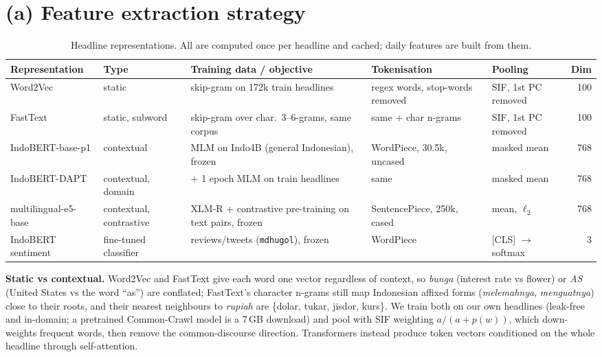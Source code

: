 \documentclass[10pt,a4paper]{article}
\begin{document}
\section{(a) Feature extraction strategy}
\begin{table}[h]
\centering\footnotesize
\caption{Headline representations. All are computed once per headline and cached; daily features are built from them.}
\label{tab:enc}
\begin{tabularx}{\textwidth}{@{}l l X p{3.3cm} p{2.3cm} r@{}}
\toprule
\textbf{Representation} & \textbf{Type} & \textbf{Training data / objective} & \textbf{Tokenisation} & \textbf{Pooling} & \textbf{Dim} \\
\midrule
Word2Vec & static & skip-gram on 172k train headlines & regex words, stop-words removed & SIF, 1st PC removed & 100 \\
FastText & static, subword & skip-gram over char.\ 3--6-grams, same corpus & same + char n-grams & SIF, 1st PC removed & 100 \\
IndoBERT-base-p1 & contextual & MLM on Indo4B (general Indonesian), frozen & WordPiece, 30.5k, uncased & masked mean & 768 \\
IndoBERT-DAPT & contextual, domain & + 1 epoch MLM on \DaptHeadlines{} train headlines & same & masked mean & 768 \\
multilingual-e5-base & contextual, contrastive & XLM-R + contrastive pre-training on text pairs, frozen & SentencePiece, 250k, cased & mean, $\ell_2$ & 768 \\
IndoBERT sentiment & fine-tuned classifier & reviews/tweets (\texttt{mdhugol}), frozen & WordPiece & [CLS] $\to$ softmax & 3 \\
\bottomrule
\end{tabularx}
\end{table}
\textbf{Static vs contextual.} Word2Vec and FastText give each word one vector regardless of context, so \emph{bunga} (interest rate vs flower) or \emph{AS} (United States vs the word ``as'') are conflated; FastText's character n-grams still map Indonesian affixed forms (\emph{melemahnya}, \emph{menguatnya}) close to their roots, and their nearest neighbours to \emph{rupiah} are \{dolar, tukar, jisdor, kurs\}. We train both on our own headlines (leak-free and in-domain; a pretrained Common-Crawl model is a 7\,GB download) and pool with SIF weighting $a/(a+p(w))$, which down-weights frequent words, then remove the common-discourse direction. Transformers instead produce token vectors conditioned on the whole headline through self-attention.
\end{document}
